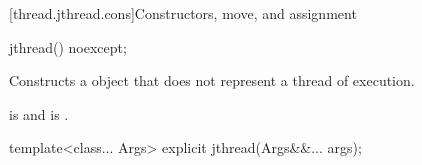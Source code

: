 [thread.jthread.cons]{Constructors, move, and assignment}

%
\begin{itemdecl}
jthread() noexcept;
\end{itemdecl}

\begin{itemdescr}
\pnum
\effects
Constructs a  object that does not represent
a thread of execution.

\pnum
\ensures
{} is 
and  is .
\end{itemdescr}

%
\begin{itemdecl}
template<class... Args> explicit jthread(Args&&... args);
\end{itemdecl}


